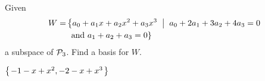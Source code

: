 
\begin{Exercise}[
name={},
title={}, 
difficulty=0,
origin={\cite{YL}}]
Given\\
\begin{align*}
W=& \left\{a_0+a_1x+a_2x^2+a_3x^3\;\;\middle|\;\;  a_0+2a_1+3a_2+4a_3=0\right. \\ 
&\left. \text{ and }a_1+a_2+a_3=0\right\}
\end{align*} 
a subspace of $\mathcal{P}_3$.  Find a basis for $W$.
\end{Exercise}

\begin{Answer}
$\mbox{$\left\{\hspace{0.1em}-1-x+x^2, -2-x+x^3\hspace{0.1em}\right\}$}$
\end{Answer}
